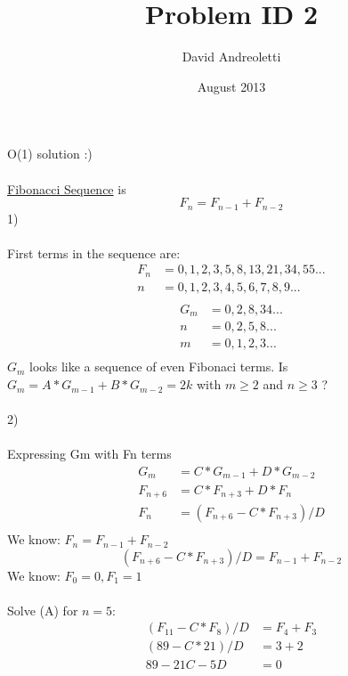 \documentclass[12pt]{report}
\begin{document}
       \title{Problem ID 2}
       \author{David Andreoletti}
       \date{August 2013} 
       \maketitle       
O(1) solution :)\\ \\
\href{http://en.wikipedia.org/wiki/Fibonacci_number}{Fibonacci Sequence} is 
\begin{equation} 
F_n = F_{n-1} + F_{n-2} 
\end{equation} 
1)\\ \\
First terms in the sequence are:
\begin{align*}
F_n    &= 0, 1, 2, 3, 5, 8, 13, 21, 34, 55 ... \\
n     &= 0, 1, 2, 3, 4, 5, 6,  7,  8,  9  ... \\
\end{align*}
\begin{align*}
G_m    &= 0, 2, 8, 34 ... \\
n     &=  0,  2,  5,  8  ... \\
m     &=  0,  1,  2,  3  ... \\
\end{align*}
\(G_m\) looks like a sequence of even Fibonaci terms. Is \(G_m = A*G_{m-1} + B*G_{m-2} = 2k\)
 with \(m \geq 2\) and \(n \geq 3\) ?  \\ \\
2) \\ \\
Expressing Gm with Fn terms 
\begin{equation} 
\begin{aligned}
 G_m &= C*G_{m-1} + D*G_{m-2} \\
 F_{n+6} &= C*F_{n+3} + D*F_n \\
 F_n &= (F_{n+6} - C*F_{n+3}) / D \\
\end{aligned}
\end{equation} 
We know: \(F_n = F_{n-1} + F_{n-2}\) 
\begin{equation} 
 (F_{n+6} - C*F_{n+3}) / D = F_{n-1} + F_{n-2}
\end{equation} 
We know: \(F_0 = 0, F_1 = 1\) \\ \\
Solve (A) for \(n=5:\) 
\begin{equation} 
\begin{aligned} \label{eq:a1}
  (F_{11} - C*F_8) / D &= F_4 + F_3 \\
  (89 - C*21) / D &= 3 + 2  \\
  89 - 21C - 5D &= 0        \\
\end{aligned}
\end{equation} 
\end{document}
